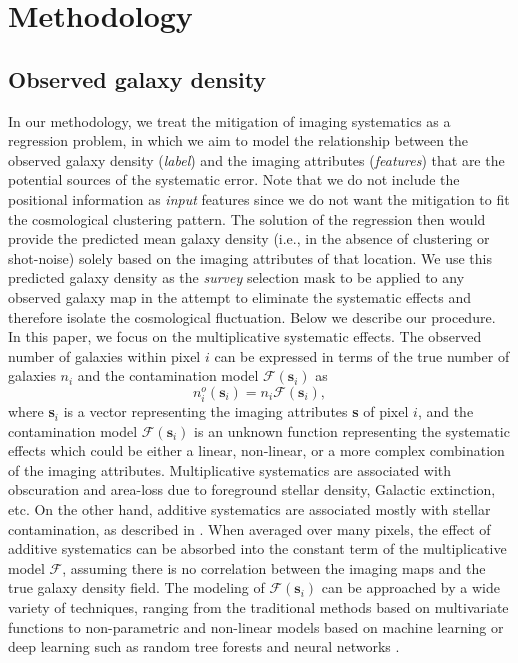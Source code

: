 %
%
\section{Methodology}\label{sec:method}
\subsection{Observed galaxy density}
In our methodology, we treat the mitigation of imaging systematics as a regression problem, in which we aim to model the relationship between the observed galaxy density (\textit{label}) and the imaging attributes (\textit{features}) that are the potential sources of the systematic error. Note that we do not include the positional information as \textit{input} features since we do not want the mitigation to fit the cosmological clustering pattern. The solution of the regression then would provide the predicted mean galaxy density (i.e., in the absence of clustering or shot-noise) solely based on the imaging attributes of that location. We use this predicted galaxy density as the \textit{survey} selection mask to be applied to any observed galaxy map in the attempt to eliminate the systematic effects and therefore isolate the cosmological fluctuation. Below we describe our procedure.\\


In this paper, we focus on the multiplicative systematic effects. The observed number of galaxies within pixel $i$ can be expressed in terms of the true number of galaxies $n_{i}$ and the contamination model $\mathcal{F}(\textbf{s}_{i})$ as 
\begin{equation}\label{eq:ngal_fs}
    n_{i}^{o}(\textbf{s}_{i}) = n_{i} \mathcal{F}(\textbf{s}_{i}), 
\end{equation}
where \textbf{s}$_{i}$ is a vector representing the imaging attributes \textbf{s} of pixel $i$, and the contamination model $\mathcal{F}(\textbf{s}_i)$ is an unknown function representing the systematic effects which could be either a linear, non-linear, or a more complex combination of the imaging attributes. Multiplicative systematics are associated with obscuration and area-loss due to foreground stellar density, Galactic extinction, etc. On the other hand, additive systematics are associated mostly with stellar contamination, as described in \citet{myers2007clustering, ross2011ameliorating, 2012ApJ...761...14H, prakash2016sdss, 2016MNRAS.455.4301C}. When averaged over many pixels, the effect of additive systematics can be absorbed into the constant term of the multiplicative model $\mathcal{F}$, assuming there is no correlation between the imaging maps and the true galaxy density field. The modeling of $\mathcal{F}(\textbf{s}_{i})$ can be approached by a wide variety of techniques, ranging from the traditional methods based on multivariate functions to non-parametric and non-linear models based on machine learning or deep learning such as random tree forests and neural networks \citep{breiman2001random, geurts2006extremely}.\\

